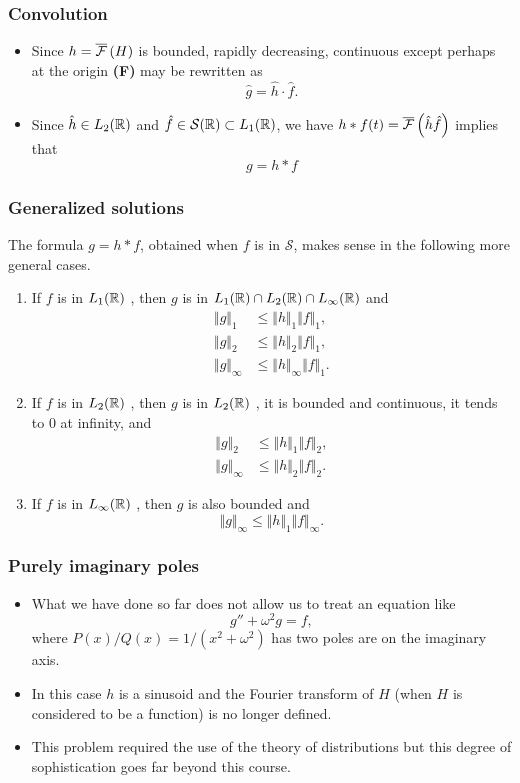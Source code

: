   
\begin{frame}    
\frametitle{Convolution}
\begin{itemize}
\item Since $h=\overline{\mathcal{F}}\left( H \right)$ is bounded, rapidly decreasing, continuous except perhaps at the origin
\alert{\textbf{(F)}} may be rewritten as
$$
\hat{g}=\hat{h}\cdot\hat{f}.
$$
\item Since $\hat{h} \in L_2(\mathbb{R})$ and $\hat{f} \in \mathcal{S}(\mathbb{R}) \subset L_1(\mathbb{R})$, 
we have $h * f(t)= \overline{\mathcal{F}}\left( \hat{h} \hat{f} \right)$ implies that
$$
g=h*f
$$
\end{itemize}
\end{frame}

\begin{frame}
\frametitle{Generalized solutions}
The formula $g=h*f$, obtained when $f$ is in $\mathcal{S}$, makes sense in the following more general cases.
\begin{enumerate}[label=(\roman*)]
\item If $f$ is in $L_1(\mathbb{R})$ , then $g$ is in $L_1(\mathbb{R})\cap L_2(\mathbb{R})\cap L_\infty(\mathbb{R})$  and
\begin{align*}
\Vert g\Vert_{1}\ &\leq\Vert h\Vert_{1}\Vert f\Vert_{1}, \\
\Vert g\Vert_{2}\ &\leq\Vert h\Vert_{2}\Vert f\Vert_{1}, \\
\Vert g\Vert_{\infty} &\leq\Vert h\Vert_{\infty}\Vert f\Vert_{1}.
\end{align*}
\item If $f$ is in $L_2(\mathbb{R})$ , then $g$ is in $L_2(\mathbb{R})$ , it is bounded and continuous, it tends to $0$ at infinity, and
\begin{align*}
\Vert g\Vert_{2}\ &\leq\Vert h\Vert_{1}\Vert f\Vert_{2}, \\
\Vert g\Vert_{\infty}& \leq \Vert h\Vert_{2}\Vert f\Vert_{2}.
\end{align*}
\item If $f$ is in $L_\infty(\mathbb{R})$ , then $g$ is also bounded and
$$
\Vert g\Vert_{\infty}\leq\Vert h\Vert_{1}\Vert f\Vert_{\infty}.
$$
\end{enumerate}
\end{frame}


\begin{frame}
\frametitle{Purely imaginary poles}
\begin{itemize}
\item What we have done so far does not allow us to treat an equation like
$$
g''+\omega^{2}g=f,
$$
where $P(x)/Q(x)=1/(x^{2}+\omega^{2})$ has two poles are on the imaginary axis.
\item In this case $h$ is a sinusoid and the Fourier transform of $H$ (when $H$ is considered to be a function) is no longer defined.
\item This problem required the use of the \alert{theory of  distributions} but this degree of sophistication goes far beyond this course.
\end{itemize}
\end{frame}

